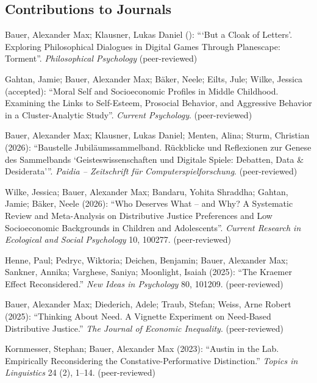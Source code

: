 \documentclass[a4paper,10pt]{article}
\newenvironment{literature}{%
   \parskip6pt\parindent0pt\raggedright
   \def\lititem{\hangindent=1cm\hangafter1}}{%
   \par\ignorespaces}
\begin{document}
\subsection*{Contributions to Journals}
\begin{literature}
\lititem Bauer, Alexander Max; Klausner, Lukas Daniel (): \enquote{\enquote{But a Cloak of Letters}. Exploring Philosophical Dialogues in Digital Games Through Planescape: Torment}. \textit{Philosophical Psychology} (peer-reviewed)


\lititem Gahtan, Jamie; Bauer, Alexander Max; Bäker, Neele; Eilts, Jule; Wilke, Jessica (accepted): \enquote{Moral Self and Socioeconomic Profiles in Middle Childhood. Examining the Links to Self-Esteem, Prosocial Behavior, and Aggressive Behavior in a Cluster-Analytic Study}. \textit{Current Psychology}. (peer-reviewed)

\lititem Bauer, Alexander Max; Klausner, Lukas Daniel; Menten, Alina; Sturm, Christian (2026): \enquote{Baustelle Jubiläumssammelband. Rückblicke und Reflexionen zur Genese des Sammelbands \enquote{Geisteswissenschaften und Digitale Spiele: Debatten, Data \& Desiderata}}. \textit{Paidia -- Zeitschrift für Computerspielforschung}. (peer-reviewed)

\lititem Wilke, Jessica; Bauer, Alexander Max; Bandaru, Yohita Shraddha; Gahtan, Jamie; Bäker, Neele (2026): \enquote{Who Deserves What -- and Why? A Systematic Review and Meta-Analysis on Distributive Justice Preferences and Low Socioeconomic Backgrounds in Children and Adolescents}. \textit{Current Research in Ecological and Social Psychology} 10, 100277. (peer-reviewed)

\lititem Henne, Paul; Pedryc, Wiktoria; Deichen, Benjamin; Bauer, Alexander Max; Sankner, Annika; Varghese, Saniya; Moonlight, Isaiah (2025): \enquote{The Kraemer Effect Reconsidered.} \textit{New Ideas in Psychology} 80, 101209. (peer-reviewed)

\lititem Bauer, Alexander Max; Diederich, Adele; Traub, Stefan; Weiss, Arne Robert (2025): \enquote{Thinking About Need. A Vignette Experiment on Need-Based Distributive Justice.} \textit{The Journal of Economic Inequality}. (peer-reviewed)

\lititem Kornmesser, Stephan; Bauer, Alexander Max (2023): \enquote{Austin in the Lab. Empirically Reconsidering the Constative-Performative Distinction.} \textit{Topics in Linguistics} 24 (2), 1--14. (peer-reviewed)


\end{literature}
\end{document}
